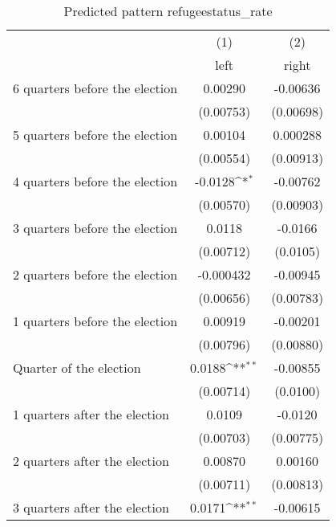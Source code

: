 \begin{table}[htbp]\centering
\def\sym#1{\ifmmode^{#1}\else\(^{#1}\)\fi}
\caption{Predicted pattern refugeestatus\_rate}
\begin{tabular}{l*{2}{c}}
\hline\hline
                    &\multicolumn{1}{c}{(1)}&\multicolumn{1}{c}{(2)}\\
                    &\multicolumn{1}{c}{left}&\multicolumn{1}{c}{right}\\
\hline
 6 quarters before the election&     0.00290         &    -0.00636         \\
                    &   (0.00753)         &   (0.00698)         \\
[1em]
 5 quarters before the election&     0.00104         &    0.000288         \\
                    &   (0.00554)         &   (0.00913)         \\
[1em]
 4 quarters before the election&     -0.0128\sym{*}  &    -0.00762         \\
                    &   (0.00570)         &   (0.00903)         \\
[1em]
 3 quarters before the election&      0.0118         &     -0.0166         \\
                    &   (0.00712)         &    (0.0105)         \\
[1em]
 2 quarters before the election&   -0.000432         &    -0.00945         \\
                    &   (0.00656)         &   (0.00783)         \\
[1em]
 1 quarters before the election&     0.00919         &    -0.00201         \\
                    &   (0.00796)         &   (0.00880)         \\
[1em]
Quarter of the election&      0.0188\sym{**} &    -0.00855         \\
                    &   (0.00714)         &    (0.0100)         \\
[1em]
 1 quarters after the election&      0.0109         &     -0.0120         \\
                    &   (0.00703)         &   (0.00775)         \\
[1em]
 2 quarters after the election&     0.00870         &     0.00160         \\
                    &   (0.00711)         &   (0.00813)         \\
[1em]
 3 quarters after the election&      0.0171\sym{**} &    -0.00615         \\

\end{tabular}
\end{table}
